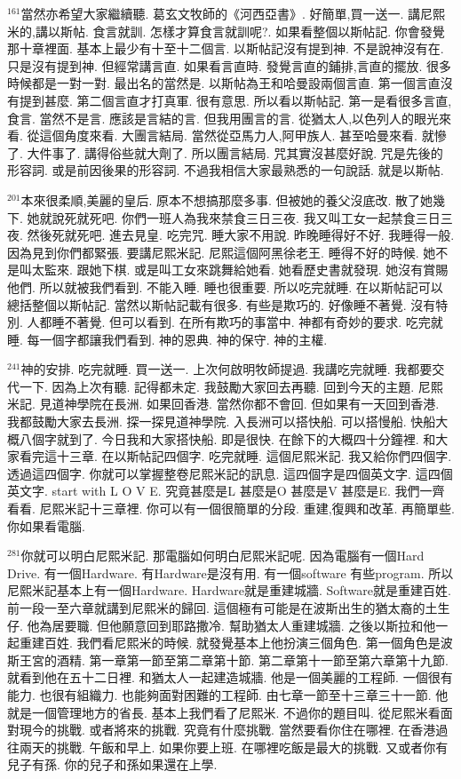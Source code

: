 \documentclass{book}
\begin{document}
$^{161}$當然亦希望大家繼續聽.
葛玄文牧師的《河西亞書》.
好簡單,買一送一.
講尼熙米的,講以斯帖.
食言就訓.
怎樣才算食言就訓呢?.
如果看整個以斯帖記.
你會發覺那十章裡面.
基本上最少有十至十二個言.
以斯帖記沒有提到神.
不是說神沒有在.
只是沒有提到神.
但經常講言直.
如果看言直時.
發覺言直的鋪排,言直的擺放.
很多時候都是一對一對.
最出名的當然是.
以斯帖為王和哈曼設兩個言直.
第一個言直沒有提到甚麼.
第二個言直才打真軍.
很有意思.
所以看以斯帖記.
第一是看很多言直,食言.
當然不是言.
應該是言結的言.
但我用團言的言.
從猶太人,以色列人的眼光來看.
從這個角度來看.
大團言結局.
當然從亞馬力人,阿甲族人.
甚至哈曼來看.
就慘了.
大件事了.
講得俗些就大劑了.
所以團言結局.
咒其實沒甚麼好說.
咒是先後的形容詞.
或是前因後果的形容詞.
不過我相信大家最熟悉的一句說話.
就是以斯帖.

$^{201}$本來很柔順,美麗的皇后.
原本不想搞那麼多事.
但被她的養父沒底改.
散了她幾下.
她就說死就死吧.
你們一班人為我來禁食三日三夜.
我又叫工女一起禁食三日三夜.
然後死就死吧.
進去見皇.
吃完咒.
睡大家不用說.
昨晚睡得好不好.
我睡得一般.
因為見到你們都緊張.
要講尼熙米記.
尼熙這個阿黑徐老王.
睡得不好的時候.
她不是叫太監來.
跟她下棋.
或是叫工女來跳舞給她看.
她看歷史書就發現.
她沒有賞賜他們.
所以就被我們看到.
不能入睡.
睡也很重要.
所以吃完就睡.
在以斯帖記可以總括整個以斯帖記.
當然以斯帖記載有很多.
有些是欺巧的.
好像睡不著覺.
沒有特別.
人都睡不著覺.
但可以看到.
在所有欺巧的事當中.
神都有奇妙的要求.
吃完就睡.
每一個字都讓我們看到.
神的恩典.
神的保守.
神的主權.

$^{241}$神的安排.
吃完就睡.
買一送一.
上次何啟明牧師提過.
我講吃完就睡.
我都要交代一下.
因為上次有聽.
記得都未定.
我鼓勵大家回去再聽.
回到今天的主題.
尼熙米記.
見道神學院在長洲.
如果回香港.
當然你都不會回.
但如果有一天回到香港.
我都鼓勵大家去長洲.
探一探見道神學院.
入長洲可以搭快船.
可以搭慢船.
快船大概八個字就到了.
今日我和大家搭快船.
即是很快.
在餘下的大概四十分鐘裡.
和大家看完這十三章.
在以斯帖記四個字.
吃完就睡.
這個尼熙米記.
我又給你們四個字.
透過這四個字.
你就可以掌握整卷尼熙米記的訊息.
這四個字是四個英文字.
這四個英文字.
start with L O V E.
究竟甚麼是L 甚麼是O 甚麼是V 甚麼是E.
我們一齊看看.
尼熙米記十三章裡.
你可以有一個很簡單的分段.
重建,復興和改革.
再簡單些.
你如果看電腦.

$^{281}$你就可以明白尼熙米記.
那電腦如何明白尼熙米記呢.
因為電腦有一個Hard Drive.
有一個Hardware.
有Hardware是沒有用.
有一個software 有些program.
所以尼熙米記基本上有一個Hardware.
Hardware就是重建城牆.
Software就是重建百姓.
前一段一至六章就講到尼熙米的歸回.
這個極有可能是在波斯出生的猶太裔的土生仔.
他為居要職.
但他願意回到耶路撒冷.
幫助猶太人重建城牆.
之後以斯拉和他一起重建百姓.
我們看尼熙米的時候.
就發覺基本上他扮演三個角色.
第一個角色是波斯王宮的酒精.
第一章第一節至第二章第十節.
第二章第十一節至第六章第十九節.
就看到他在五十二日裡.
和猶太人一起建造城牆.
他是一個美麗的工程師.
一個很有能力.
也很有組織力.
也能夠面對困難的工程師.
由七章一節至十三章三十一節.
他就是一個管理地方的省長.
基本上我們看了尼熙米.
不過你的題目叫.
從尼熙米看面對現今的挑戰.
或者將來的挑戰.
究竟有什麼挑戰.
當然要看你住在哪裡.
在香港過往兩天的挑戰.
午飯和早上.
如果你要上班.
在哪裡吃飯是最大的挑戰.
又或者你有兒子有孫.
你的兒子和孫如果還在上學.
\end{document}
